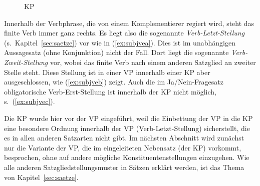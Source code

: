 \begin{exe}
  \ex\label{ex:substval}
  \begin{xlist}
  \end{xlist}
\end{exe}

\begin{figure}
  \centering
  \caption{KP}
  \label{fig:substval}
\end{figure}


Innerhalb der Verbphrase, die von einem Komplementierer regiert wird, steht das finite Verb immer ganz rechts.
Es liegt also die sogenannte \textit{Verb-Letzt-Stellung} (s.\ Kapitel~\ref{sec:saetze}) vor wie in (\ref{ex:subjvea}).
Dies ist im unabhängigen Aussagesatz (ohne Konjunktion) nicht der Fall.
Dort liegt die sogenannte \textit{Verb-Zweit-Stellung} vor, wobei das finite Verb nach einem anderen Satzglied an zweiter Stelle steht.
Diese Stellung ist in einer VP innerhalb einer KP aber ausgeschlossen, wie (\ref{ex:subjveb}) zeigt.
Auch die im Ja\slash Nein-Fragesatz obligatorische Verb-Erst-Stellung ist innerhalb der KP nicht möglich, s.\ (\ref{ex:subjvec}).

\begin{exe}
  \ex\label{ex:subjve}
  \begin{xlist}
  \end{xlist}
\end{exe}

Die KP wurde hier vor der VP eingeführt, weil die Einbettung der VP in die KP eine besondere Ordnung innerhalb der VP (Verb-Letzt-Stellung) sicherstellt, die es in allen anderen Satzarten nicht gibt.
Im nächsten Abschnitt wird zunächst nur die Variante der VP, die im eingeleiteten Nebensatz (der KP) vorkommt, besprochen, ohne auf andere mögliche Konstituentenstellungen einzugehen.
Wie alle anderen Satzgliedstellungsmuster in Sätzen erklärt werden, ist das Thema von Kapitel~\ref{sec:saetze}.

